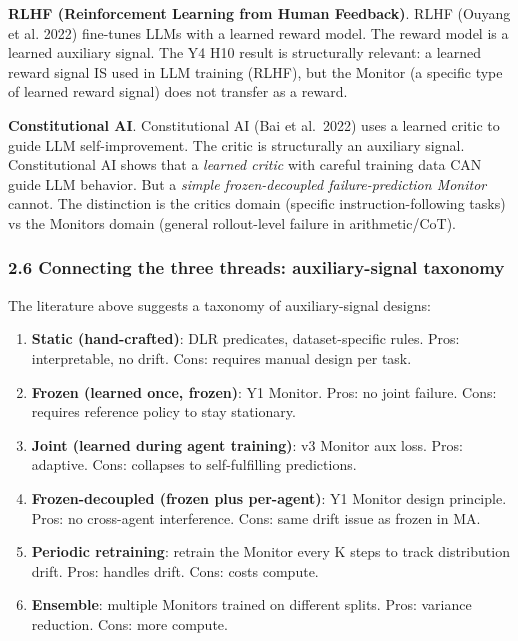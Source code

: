 \documentclass[11pt]{article}
\begin{document}
\textbf{RLHF (Reinforcement Learning from Human Feedback)}. RLHF (Ouyang
et al. 2022) fine-tunes LLMs with a learned reward model. The reward
model is a learned auxiliary signal. The Y4 H10 result is structurally
relevant: a learned reward signal IS used in LLM training (RLHF), but
the Monitor (a specific type of learned reward signal) does not transfer
as a reward.

\textbf{Constitutional AI}. Constitutional AI (Bai et al.~2022) uses a
learned critic to guide LLM self-improvement. The critic is structurally
an auxiliary signal. Constitutional AI shows that a \emph{learned
critic} with careful training data CAN guide LLM behavior. But a
\emph{simple frozen-decoupled failure-prediction Monitor} cannot. The
distinction is the critics domain (specific instruction-following tasks)
vs the Monitors domain (general rollout-level failure in
arithmetic/CoT).

\subsubsection{2.6 Connecting the three threads: auxiliary-signal
taxonomy}\label{connecting-the-three-threads-auxiliary-signal-taxonomy}

The literature above suggests a taxonomy of auxiliary-signal designs:

\begin{enumerate}
\def\labelenumi{\arabic{enumi}.}

\item
  \textbf{Static (hand-crafted)}: DLR predicates, dataset-specific
  rules. Pros: interpretable, no drift. Cons: requires manual design per
  task.
\item
  \textbf{Frozen (learned once, frozen)}: Y1 Monitor. Pros: no joint
  failure. Cons: requires reference policy to stay stationary.
\item
  \textbf{Joint (learned during agent training)}: v3 Monitor aux loss.
  Pros: adaptive. Cons: collapses to self-fulfilling predictions.
\item
  \textbf{Frozen-decoupled (frozen plus per-agent)}: Y1 Monitor design
  principle. Pros: no cross-agent interference. Cons: same drift issue
  as frozen in MA.
\item
  \textbf{Periodic retraining}: retrain the Monitor every K steps to
  track distribution drift. Pros: handles drift. Cons: costs compute.
\item
  \textbf{Ensemble}: multiple Monitors trained on different splits.
  Pros: variance reduction. Cons: more compute.
\end{enumerate}
\end{document}
